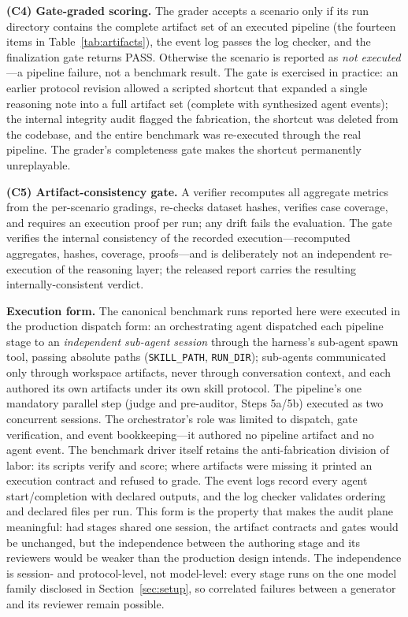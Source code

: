 \documentclass[preprint,10pt]{elsarticle}
\begin{document}
\textbf{(C4) Gate-graded scoring.} The grader accepts a scenario only if its run directory contains the complete artifact set of an executed pipeline (the fourteen items in Table~\ref{tab:artifacts}), the event log passes the log checker, and the finalization gate returns PASS. Otherwise the scenario is reported as \emph{not executed}---a pipeline failure, not a benchmark result. The gate is exercised in practice: an earlier protocol revision allowed a scripted shortcut that expanded a single reasoning note into a full artifact set (complete with synthesized agent events); the internal integrity audit flagged the fabrication, the shortcut was deleted from the codebase, and the entire benchmark was re-executed through the real pipeline. The grader's completeness gate makes the shortcut permanently unreplayable.

\textbf{(C5) Artifact-consistency gate.} A verifier recomputes all aggregate metrics from the per-scenario gradings, re-checks dataset hashes, verifies case coverage, and requires an execution proof per run; any drift fails the evaluation. The gate verifies the internal consistency of the recorded execution---recomputed aggregates, hashes, coverage, proofs---and is deliberately not an independent re-execution of the reasoning layer; the released report carries the resulting internally-consistent verdict.

\textbf{Execution form.} The canonical benchmark runs reported here were executed in the production dispatch form: an orchestrating agent dispatched each pipeline stage to an \emph{independent sub-agent session} through the harness's sub-agent spawn tool, passing absolute paths (\texttt{SKILL\_PATH}, \texttt{RUN\_DIR}); sub-agents communicated only through workspace artifacts, never through conversation context, and each authored its own artifacts under its own skill protocol. The pipeline's one mandatory parallel step (judge and pre-auditor, Steps 5a/5b) executed as two concurrent sessions. The orchestrator's role was limited to dispatch, gate verification, and event bookkeeping---it authored no pipeline artifact and no agent event. The benchmark driver itself retains the anti-fabrication division of labor: its scripts verify and score; where artifacts were missing it printed an execution contract and refused to grade. The event logs record every agent start/completion with declared outputs, and the log checker validates ordering and declared files per run. This form is the property that makes the audit plane meaningful: had stages shared one session, the artifact contracts and gates would be unchanged, but the independence between the authoring stage and its reviewers would be weaker than the production design intends. The independence is session- and protocol-level, not model-level: every stage runs on the one model family disclosed in Section~\ref{sec:setup}, so correlated failures between a generator and its reviewer remain possible.
\end{document}
